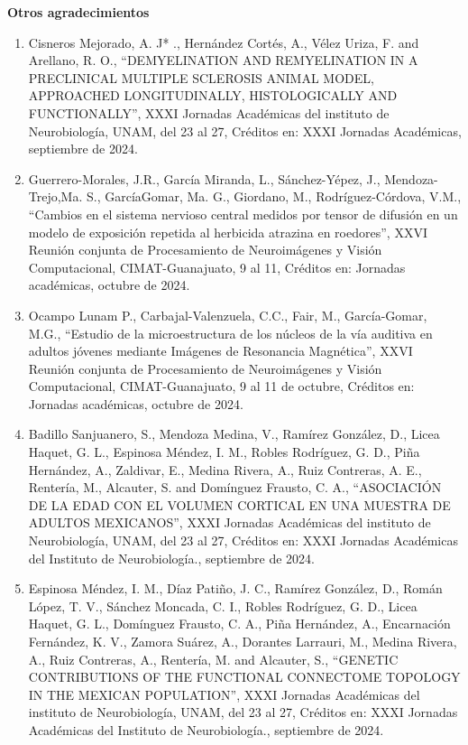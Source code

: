 \textbf{Otros agradecimientos}

\hfill

\begin{enumerate}

\item Cisneros Mejorado, A. J* ., Hernández Cortés, A., Vélez Uriza, F. and Arellano, R. O., “DEMYELINATION AND REMYELINATION 
IN A PRECLINICAL MULTIPLE SCLEROSIS ANIMAL MODEL, APPROACHED LONGITUDINALLY, HISTOLOGICALLY AND FUNCTIONALLY”, XXXI 
Jornadas Académicas del instituto de Neurobiología, UNAM, del 23 al 27, Créditos en: XXXI Jornadas Académicas, septiembre 
de 2024.

\item Guerrero-Morales, J.R., García Miranda, L., Sánchez-Yépez, J., Mendoza-Trejo,Ma. S., GarcíaGomar, Ma. G., Giordano, M., 
Rodríguez-Córdova, V.M., “Cambios en el sistema nervioso central medidos por tensor de difusión en un modelo de exposición 
repetida al herbicida atrazina en roedores”, XXVI Reunión conjunta de Procesamiento de Neuroimágenes y Visión 
Computacional, CIMAT-Guanajuato, 9 al 11, Créditos en: Jornadas académicas, octubre de 2024.

\item Ocampo Lunam P., Carbajal-Valenzuela, C.C., Fair, M., García-Gomar, M.G., “Estudio de la microestructura de los núcleos 
de la vía auditiva en adultos jóvenes mediante Imágenes de Resonancia Magnética”, XXVI Reunión conjunta de Procesamiento de 
Neuroimágenes y Visión Computacional, CIMAT-Guanajuato, 9 al 11 de octubre, Créditos en: Jornadas académicas, octubre de 
2024.

\item Badillo Sanjuanero, S., Mendoza Medina, V., Ramírez González, D., Licea Haquet, G. L., Espinosa Méndez, I. M., Robles 
Rodríguez, G. D., Piña Hernández, A., Zaldivar, E., Medina Rivera, A., Ruiz Contreras, A. E., Rentería, M., Alcauter, S. 
and Domínguez Frausto, C. A., “ASOCIACIÓN DE LA EDAD CON EL VOLUMEN CORTICAL EN UNA MUESTRA DE ADULTOS MEXICANOS”, XXXI 
Jornadas Académicas del instituto de Neurobiología, UNAM, del 23 al 27, Créditos en: XXXI Jornadas Académicas del Instituto 
de Neurobiología., septiembre de 2024.

\item Espinosa Méndez, I. M., Díaz Patiño, J. C., Ramírez González, D., Román López, T. V., Sánchez Moncada, C. I., Robles 
Rodríguez, G. D., Licea Haquet, G. L., Domínguez Frausto, C. A., Piña Hernández, A., Encarnación Fernández, K. V., Zamora 
Suárez, A., Dorantes Larrauri, M., Medina Rivera, A., Ruiz Contreras, A., Rentería, M. and Alcauter, S., “GENETIC 
CONTRIBUTIONS OF THE FUNCTIONAL CONNECTOME TOPOLOGY IN THE MEXICAN POPULATION”, XXXI Jornadas Académicas del instituto de 
Neurobiología, UNAM, del 23 al 27, Créditos en: XXXI Jornadas Académicas del Instituto de Neurobiología., septiembre de 
2024.


\end{enumerate}
